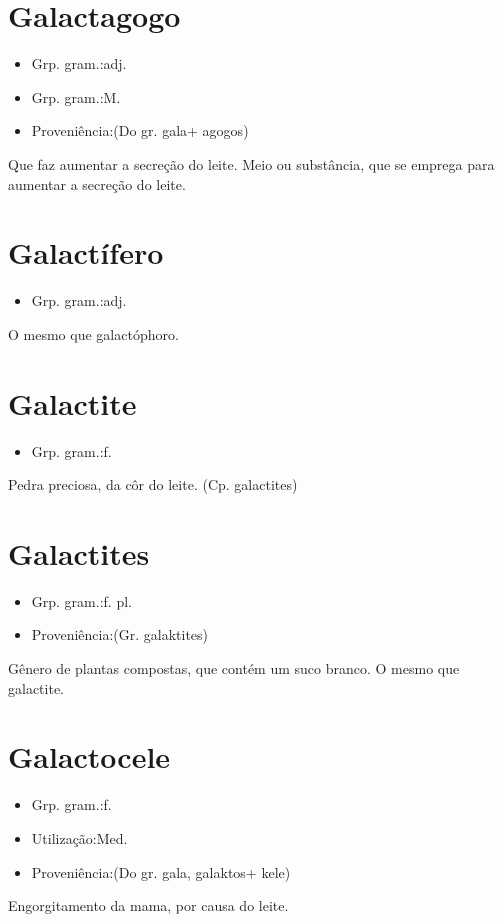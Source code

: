 \section{Galactagogo}
\begin{itemize}
\item {Grp. gram.:adj.}
\end{itemize}
\begin{itemize}
\item {Grp. gram.:M.}
\end{itemize}
\begin{itemize}
\item {Proveniência:(Do gr. \textunderscore gala\textunderscore  + \textunderscore agogos\textunderscore )}
\end{itemize}
Que faz aumentar a secreção do leite.
Meio ou substância, que se emprega para aumentar a secreção do leite.
\section{Galactífero}
\begin{itemize}
\item {Grp. gram.:adj.}
\end{itemize}
O mesmo que \textunderscore galactóphoro\textunderscore .
\section{Galactite}
\begin{itemize}
\item {Grp. gram.:f.}
\end{itemize}
Pedra preciosa, da côr do leite.
(Cp. \textunderscore galactites\textunderscore )
\section{Galactites}
\begin{itemize}
\item {Grp. gram.:f. pl.}
\end{itemize}
\begin{itemize}
\item {Proveniência:(Gr. \textunderscore galaktites\textunderscore )}
\end{itemize}
Gênero de plantas compostas, que contém um suco branco.
O mesmo que \textunderscore galactite\textunderscore .
\section{Galactocele}
\begin{itemize}
\item {Grp. gram.:f.}
\end{itemize}
\begin{itemize}
\item {Utilização:Med.}
\end{itemize}
\begin{itemize}
\item {Proveniência:(Do gr. \textunderscore gala\textunderscore , \textunderscore galaktos\textunderscore  + \textunderscore kele\textunderscore )}
\end{itemize}
Engorgitamento da mama, por causa do leite.
